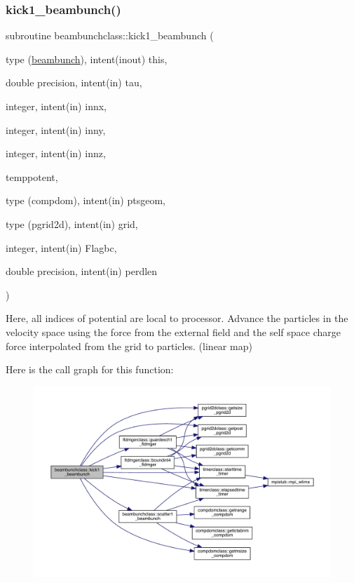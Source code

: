 \subsubsection{\texorpdfstring{kick1\_beambunch()}{kick1\_beambunch()}}
{\footnotesize\ttfamily subroutine beambunchclass\+::kick1\+\_\+beambunch (\begin{DoxyParamCaption}\item[{type (\mbox{\hyperlink{namespacebeambunchclass_structbeambunchclass_1_1beambunch}{beambunch}}), intent(inout)}]{this,  }\item[{double precision, intent(in)}]{tau,  }\item[{integer, intent(in)}]{innx,  }\item[{integer, intent(in)}]{inny,  }\item[{integer, intent(in)}]{innz,  }\item[{}]{temppotent,  }\item[{type (compdom), intent(in)}]{ptsgeom,  }\item[{type (pgrid2d), intent(in)}]{grid,  }\item[{integer, intent(in)}]{Flagbc,  }\item[{double precision, intent(in)}]{perdlen }\end{DoxyParamCaption})}



Here, all indices of potential are local to processor. Advance the particles in the velocity space using the force from the external field and the self space charge force interpolated from the grid to particles. (linear map) 

Here is the call graph for this function\+:\nopagebreak
\begin{figure}[H]
\begin{center}
\leavevmode
\includegraphics[width=350pt]{namespacebeambunchclass_abf23fdc1e8ca69fe7fe8f2995fbc1bcc_cgraph}
\end{center}
\end{figure}
\mbox{\label{namespacebeambunchclass_a02f7f46438747a0fb811de64b1ed95aa}} 
